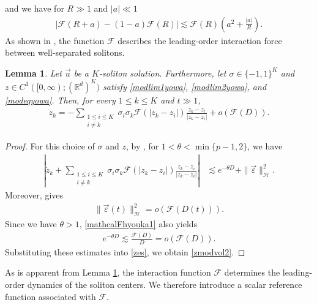 \documentclass[10pt,a4paper]{amsart}
\newtheorem{lemma}[theorem]{Lemma}
\numberwithin{equation}{section}
\begin{document}
and we have for $R\gg1$ and $|a|\ll 1$
\begin{align}\label{tukaeruF2}
\left|\mathcal{F}(R+a)-(1-a)\mathcal{F}(R)\right|\lesssim \mathcal{F}(R)\left(a^2+\frac{|a|}{R}\right).
\end{align}
As shown in \cite[Section 3]{I2}, the function $\mathcal{F}$ describes the leading-order interaction force between
well-separated solitons.
\begin{lemma}\label{centerdynamics}
Let $\vec{u}$ be a $K$-soliton solution. Furthermore, let $\sigma\in\{-1,1\}^K$ and $z\in C^1([0,\infty);(\mathbb{R}^d)^K)$ satisfy \eqref{modlim1yowa}, \eqref{modlim2yowa}, and \eqref{modeqyowa}. Then, for every $1\leq k\leq K$ and $t\gg1$,
\begin{align}\label{zmodvol2}
\dot{z}_k
=-\sum_{\substack{1\leq i\leq K\\ i\neq k}}\sigma_i\sigma_k\mathcal{F}(|z_k-z_i|)
\frac{z_k-z_i}{|z_k-z_i|}
+o(\mathcal{F}(D)).
\end{align}
\end{lemma}
\begin{proof}
For this choice of $\sigma$ and $z$, by \cite[Lemma 3.3]{I2}, for $1<\theta<\min\{p-1,2\}$, we have
\begin{align}
\left|\dot{z}_k+\sum_{\substack{1\leq i\leq K\\ i\neq k}}\sigma_i\sigma_k\mathcal{F}(|z_k-z_i|)
\frac{z_k-z_i}{|z_k-z_i|}\right|
&\lesssim e^{-\theta D}+\|\vec{\varepsilon}\|_{\mathcal{H}}^2.\label{zes}
\end{align}
Moreover, \cite[Lemma 3.8]{I2} gives
\begin{align*}
\|\vec{\varepsilon}(t)\|_{\mathcal H}^2=o(\mathcal F(D(t))).
\end{align*}
Since we have $\theta>1$, \eqref{mathcalFhyouka1} also yields
\begin{align*}
e^{-\theta D}\lesssim \frac{\mathcal F(D)}{D}=o(\mathcal F(D)).
\end{align*}
Substituting these estimates into \eqref{zes}, we obtain \eqref{zmodvol2}.
\end{proof}

As is apparent from Lemma \ref{centerdynamics}, the interaction
function $\mathcal{F}$ determines the leading-order dynamics of the
soliton centers. We therefore introduce a scalar reference function
associated with $\mathcal{F}$.
\end{document}
